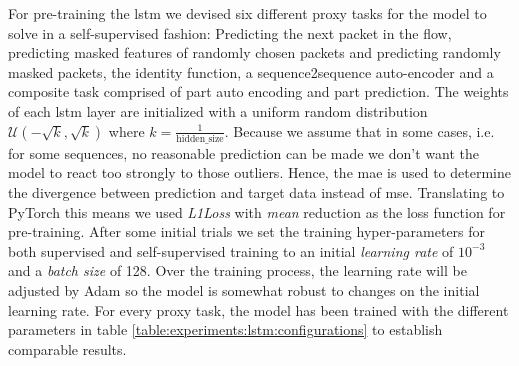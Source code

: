 For pre-training the \gls{lstm} we devised six different proxy tasks for the model to solve in a self-supervised fashion: Predicting the next packet in the flow, predicting masked features of randomly chosen packets and predicting randomly masked packets, the identity function, a sequence2sequence auto-encoder and a composite task comprised of part auto encoding and part prediction. 
The weights of each \gls{lstm} layer are initialized with a uniform random distribution $\mathcal{U}(-\sqrt{k}, \sqrt{k})$ where $k = \frac{1}{\text{hidden\_size}}$. Because we assume that in some cases, i.e. for some sequences, no reasonable prediction can be made we don't want the model to react too strongly to those outliers. Hence, the \gls{mae} is used to determine the divergence between prediction and target data instead of \gls{mse}. Translating to PyTorch this means we used \textit{L1Loss} with \textit{mean} reduction as the loss function for pre-training. After some initial trials we set the training hyper-parameters for both supervised and self-supervised training to an initial \textit{learning rate} of $10^{-3}$ and a \textit{batch size} of 128. Over the training process, the learning rate will be adjusted by Adam so the model is somewhat robust to changes on the initial learning rate. For every proxy task, the model has been trained with the different parameters in table \ref{table:experiments:lstm:configurations} to establish comparable results.

